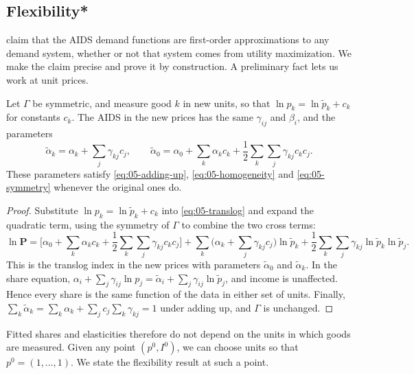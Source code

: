 \subsection{Flexibility*}\label{sec:05-aids-flexibility}

\citet[p.~315]{DeatonMuellbauer1980a} claim that the AIDS demand functions are first-order approximations to
any demand system, whether or not that system comes from utility maximization. We make the claim precise and
prove it by construction. A preliminary fact lets us work at unit prices.

\begin{lemma}\label{lem:05-units}
Let $\Gamma$ be symmetric, and measure good $k$ in new units, so that $\ln p_k = \ln\tilde p_k + c_k$ for
constants $c_k$. The AIDS in the new prices has the same $\gamma_{ij}$ and $\beta_i$, and the parameters
\begin{equation*}
\tilde\alpha_k = \alpha_k + \sum_j\gamma_{kj}c_j, \qquad
\tilde\alpha_0 = \alpha_0 + \sum_k\alpha_kc_k + \frac{1}{2}\sum_k\sum_j\gamma_{kj}c_kc_j .
\end{equation*}
These parameters satisfy \eqref{eq:05-adding-up}, \eqref{eq:05-homogeneity} and \eqref{eq:05-symmetry}
whenever the original ones do.
\end{lemma}

\begin{proof}
Substitute $\ln p_k = \ln\tilde p_k + c_k$ into \eqref{eq:05-translog} and expand the quadratic term, using
the symmetry of $\Gamma$ to combine the two cross terms:
\begin{equation*}
\ln\mathbf{P} = \Big[\alpha_0 + \sum_k\alpha_kc_k + \frac{1}{2}\sum_k\sum_j\gamma_{kj}c_kc_j\Big]
+ \sum_k\Big(\alpha_k + \sum_j\gamma_{kj}c_j\Big)\ln\tilde p_k
+ \frac{1}{2}\sum_k\sum_j\gamma_{kj}\ln\tilde p_k\ln\tilde p_j .
\end{equation*}
This is the translog index in the new prices with parameters $\tilde\alpha_0$ and $\tilde\alpha_k$. In the
share equation, $\alpha_i + \sum_j\gamma_{ij}\ln p_j = \tilde\alpha_i + \sum_j\gamma_{ij}\ln\tilde p_j$, and
income is unaffected. Hence every share is the same function of the data in either set of units. Finally,
$\sum_k\tilde\alpha_k = \sum_k\alpha_k + \sum_jc_j\sum_k\gamma_{kj} = 1$ under adding up, and $\Gamma$ is
unchanged.
\end{proof}

Fitted shares and elasticities therefore do not depend on the units in which goods are measured. Given any
point $(p^0, I^0)$, we can choose units so that $p^0 = (1, \dots, 1)$. We state the flexibility result at such
a point.


